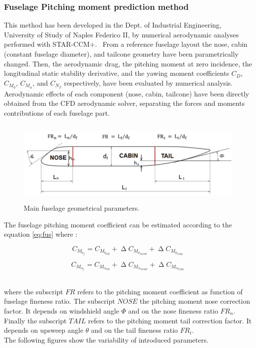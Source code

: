 \subsubsection{Fuselage Pitching moment prediction method}
This method has been developed in the Dept. of Industrial Engineering, University of Study of Naples Federico II, by numerical aerodynamic analyses performed with STAR-CCM+. \
From a reference fuselage layout the nose, cabin (constant fuselage diameter), and tailcone geometry have been parametrically changed. Then, the aerodynamic drag, the pitching moment at zero incidence, the longitudinal static stability derivative, and the yawing moment coefficients $C_D$, $C_{M_0}$, $C_{M_{\alpha}}$, and $C_{N_{\beta}}$ respectively, have been evaluated by numerical analysis. Aerodynamic effects of each component (nose, cabin, tailcone) have been directly obtained from the CFD aerodynamic solver, separating the forces and moments contributions of each fuselage part. \cite{fuselageunina}


\begin{figure}[H]
\centering
\includegraphics[height=4.1cm]{Immagini/fuselage}
\caption{Main fuselage geometrical parameters.}
\label{fusgeometry}
\end{figure}


The fuselage pitching moment coefficient can be estimated according to the equation \ref{eq:fus} where :

\begin{equation}
C_{M_{0_f}} = C_{M_{0_{FR}}} + \upDelta C_{M_{0_{NOSE}}} +  \upDelta C_{M_{0_{TAIL}}}
\end{equation}

\begin{equation}
C_{M_{{\alpha}_f}} = C_{M_{{\alpha}_{FR}}} + \upDelta C_{M_{{\alpha}_{NOSE}}} +  \upDelta C_{M_{{\alpha}_{TAIL}}}
\end{equation}

\noindent \\

where the subscript $FR$ refers to the pitching moment coefficient as function of fuselage fineness ratio. The subscript $NOSE$ the pitching moment nose correction factor. It depends on windshield angle $\Phi$ and on the nose fineness ratio $FR_n$. Finally the subscript $TAIL$ refers to the pitching moment tail correction factor. It depends on upsweep angle $\theta$ and on the tail fineness ratio $FR_t$.\\
The following figures show the variability of introduced parameters.

